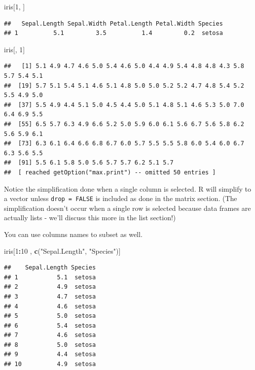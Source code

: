 \documentclass[
]{book}
\newenvironment{Shaded}{\begin{snugshade}}{\end{snugshade}}
\newcommand{\DecValTok}[1]{\textcolor[rgb]{0.00,0.00,0.81}{#1}}
\newcommand{\KeywordTok}[1]{\textcolor[rgb]{0.13,0.29,0.53}{\textbf{#1}}}
\newcommand{\NormalTok}[1]{#1}
\newcommand{\OperatorTok}[1]{\textcolor[rgb]{0.81,0.36,0.00}{\textbf{#1}}}
\newcommand{\StringTok}[1]{\textcolor[rgb]{0.31,0.60,0.02}{#1}}
\theoremstyle{definition}
\theoremstyle{definition}
\theoremstyle{definition}
\theoremstyle{remark}
\begin{document}
\begin{Shaded}
\begin{Highlighting}[]
\NormalTok{iris[}\DecValTok{1}\NormalTok{, ]}
\end{Highlighting}
\end{Shaded}

\begin{verbatim}
##   Sepal.Length Sepal.Width Petal.Length Petal.Width Species
## 1          5.1         3.5          1.4         0.2  setosa
\end{verbatim}

\begin{Shaded}
\begin{Highlighting}[]
\NormalTok{iris[, }\DecValTok{1}\NormalTok{]}
\end{Highlighting}
\end{Shaded}

\begin{verbatim}
##   [1] 5.1 4.9 4.7 4.6 5.0 5.4 4.6 5.0 4.4 4.9 5.4 4.8 4.8 4.3 5.8 5.7 5.4 5.1
##  [19] 5.7 5.1 5.4 5.1 4.6 5.1 4.8 5.0 5.0 5.2 5.2 4.7 4.8 5.4 5.2 5.5 4.9 5.0
##  [37] 5.5 4.9 4.4 5.1 5.0 4.5 4.4 5.0 5.1 4.8 5.1 4.6 5.3 5.0 7.0 6.4 6.9 5.5
##  [55] 6.5 5.7 6.3 4.9 6.6 5.2 5.0 5.9 6.0 6.1 5.6 6.7 5.6 5.8 6.2 5.6 5.9 6.1
##  [73] 6.3 6.1 6.4 6.6 6.8 6.7 6.0 5.7 5.5 5.5 5.8 6.0 5.4 6.0 6.7 6.3 5.6 5.5
##  [91] 5.5 6.1 5.8 5.0 5.6 5.7 5.7 6.2 5.1 5.7
##  [ reached getOption("max.print") -- omitted 50 entries ]
\end{verbatim}

Notice the simplification done when a single column is selected. R will simplify to a vector unless \texttt{drop\ =\ FALSE} is included as done in the matrix section. (The simplification doesn't occur when a single row is selected because data frames are actually lists - we'll discuss this more in the list section!)

You can use columns names to subset as well.

\begin{Shaded}
\begin{Highlighting}[]
\NormalTok{iris[}\DecValTok{1}\OperatorTok{:}\DecValTok{10}\NormalTok{ , }\KeywordTok{c}\NormalTok{(}\StringTok{"Sepal.Length"}\NormalTok{, }\StringTok{"Species"}\NormalTok{)]}
\end{Highlighting}
\end{Shaded}

\begin{verbatim}
##    Sepal.Length Species
## 1           5.1  setosa
## 2           4.9  setosa
## 3           4.7  setosa
## 4           4.6  setosa
## 5           5.0  setosa
## 6           5.4  setosa
## 7           4.6  setosa
## 8           5.0  setosa
## 9           4.4  setosa
## 10          4.9  setosa
\end{verbatim}
\end{document}
